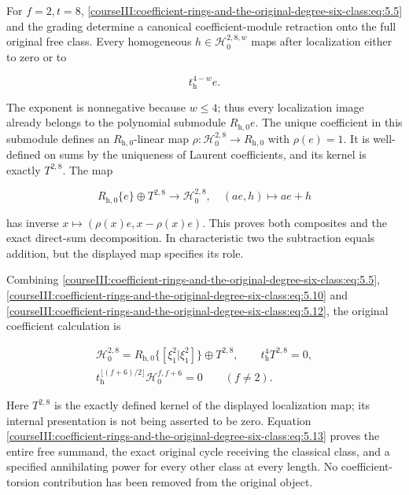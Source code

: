 For \(f=2,t=8\), \eqref{courseIII:coefficient-rings-and-the-original-degree-six-class:eq:5.5} and the grading determine a canonical coefficient-module retraction onto the full original free class. Every homogeneous \(h\in\mathcal H_0^{2,8,w}\) maps after localization either to zero or to

\begin{equation}
t_{\mathrm h}^{4-w}e.
 \label{courseIII:coefficient-rings-and-the-original-degree-six-class:eq:5.11}
\end{equation}

The exponent is nonnegative because \(w\leq4\); thus every localization image already belongs to the polynomial submodule \(R_{\mathrm h,0}e\). The unique coefficient in this submodule defines an \(R_{\mathrm h,0}\)-linear map
\(\rho:\mathcal H_0^{2,8}\to R_{\mathrm h,0}\) with \(\rho(e)=1\).
It is well-defined on sums by the uniqueness of Laurent coefficients, and its kernel is exactly \(T^{2,8}\). The map

\begin{equation}
R_{\mathrm h,0}\{e\}\oplus T^{2,8}
       \longrightarrow\mathcal H_0^{2,8},
 \quad (ae,h)\longmapsto ae+h
 \label{courseIII:coefficient-rings-and-the-original-degree-six-class:eq:5.12}
\end{equation}

has inverse \(x\mapsto(\rho(x)e,x-\rho(x)e)\). This proves both composites and the exact direct-sum decomposition. In characteristic two the subtraction equals addition, but the displayed map specifies its role.

Combining \eqref{courseIII:coefficient-rings-and-the-original-degree-six-class:eq:5.5}, \eqref{courseIII:coefficient-rings-and-the-original-degree-six-class:eq:5.10} and \eqref{courseIII:coefficient-rings-and-the-original-degree-six-class:eq:5.12}, the original coefficient calculation is

\begin{equation}
\begin{gathered}
 \mathcal H_0^{2,8}
      =R_{\mathrm h,0}\{[\xi_1^2|\xi_1^2]\}\oplus T^{2,8},
 \qquad t_{\mathrm h}^{4}T^{2,8}=0,\\
 t_{\mathrm h}^{\lfloor(f+6)/2\rfloor}
             \mathcal H_0^{f,f+6}=0\qquad(f\ne2).
 \end{gathered}
 \label{courseIII:coefficient-rings-and-the-original-degree-six-class:eq:5.13}
\end{equation}

Here \(T^{2,8}\) is the exactly defined kernel of the displayed localization map; its internal presentation is not being asserted to be zero. Equation \eqref{courseIII:coefficient-rings-and-the-original-degree-six-class:eq:5.13} proves the entire free summand, the exact original cycle receiving the classical class, and a specified annihilating power for every other class at every length. No coefficient-torsion contribution has been removed from the original object.

